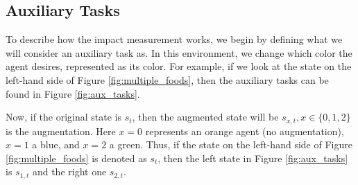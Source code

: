 \documentclass[12pt,A4]{report}
\theoremstyle{definition}
\begin{document}
\subsection{Auxiliary Tasks}
To describe how the impact measurement works, we begin by defining what we will consider an auxiliary task as. In this environment, we change which color the agent desires, represented as its color. For example, if we look at the state on the left-hand side of Figure \ref{fig:multiple_foods}, then the auxiliary tasks can be found in Figure \ref{fig:aux_tasks}.

Now, if the original state is $s_t$, then the augmented state will be $s_{x,t}, x \in \{0, 1, 2\}$ is the augmentation. Here $x=0$ represents an orange agent (no augmentation), $x=1$ a blue, and $x=2$ a green. Thus, if the state on the left-hand side of Figure \ref{fig:multiple_foods} is denoted as $s_t$, then the left state in Figure \ref{fig:aux_tasks} is $s_{1,t}$ and the right one $s_{2,t}$.
\end{document}
